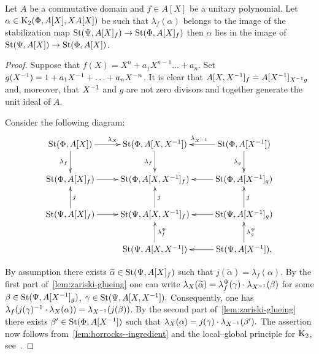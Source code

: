 \begin{lemma} \label{lem:horrocks-b}
 Let $A$ be a commutative domain and $f \in A[X]$ be a unitary polynomial.
 Let $\alpha \in \operatorname{K}_2(\Phi, A[X], XA[X])$ be such that $\lambda_f(\alpha)$ belongs to the image of the stabilization map
 $\operatorname{St}(\Psi, A[X]_f) \to \operatorname{St}(\Phi, A[X]_f)$ then $\alpha$ lies in the image of $\operatorname{St}(\Psi, A[X]) \to \operatorname{St}(\Phi, A[X])$.
\end{lemma}
\begin{proof}
    Suppose that $f(X) = X^n + a_1 X^{n-1} \ldots + a_n$.
    Set $g(X^{-1}) = 1 + a_1 X^{-1} + \ldots + a_{n} X^{-n}$.
    It is clear that $A[X, X^{-1}]_f = A[X^{-1}]_{X^{-1} g}$ and, moreover, that $X^{-1}$ and $g$ are not zero divisors and together generate the unit ideal of $A$.

    Consider the following diagram:
    \[ \xymatrix{\St(\Phi, A[X]) \ar[r]^{\lambda_X} \ar[d]_{\lambda_f} & \St(\Phi, A[X, X\inv]) \ar[d]_{\lambda_f}  & \St(\Phi, A[X\inv]) \ar[l]_{\lambda_{X\inv}} \ar[d]_{\lambda_g}  \\
                 \St(\Phi, A[X]_f) \ar[r] & \St(\Phi, A[X, X\inv]_f) & \St(\Phi, A[X\inv]_g) \ar[l] \\
                 \St(\Psi, A[X]_f) \ar[r] \ar[u]_j & \St(\Psi, A[X, X\inv]_f) \ar[u]_j & \St(\Psi, A[X\inv]_g) \ar[l] \ar[u]_j \\
                                   & \St(\Psi, A[X, X\inv]) \ar[u]_{\lambda_f^\Psi}   & \St(\Psi, A[X\inv]). \ar[l] \ar[u]_{\lambda_g^\Psi}}\]

    By assumption there exists $\widetilde{\alpha} \in \operatorname{St}(\Psi, A[X]_f)$ such that $j(\widetilde{\alpha}) = \lambda_f(\alpha)$.
    By the first part of~\cref{lem:zariski-glueing} one can write $\lambda_X(\widetilde{\alpha}) = \lambda_f^\Psi(\gamma) \cdot \lambda_{X^{-1}}(\beta)$
     for some $\beta \in \operatorname{St}(\Psi, A[X^{-1}]_g)$, $\gamma \in \operatorname{St}(\Psi, A[X, X^{-1}]).$
    Consequently, one has $\lambda_f(j(\gamma)^{-1} \cdot \lambda_X(\alpha)) = \lambda_{X^{-1}}(j(\beta))$.
    By the second part of~\cref{lem:zariski-glueing} there exists $\beta' \in \operatorname{St}(\Phi, A[X^{-1}])$ such that $\lambda_X(\alpha) = j(\gamma) \cdot \lambda_{X^{-1}}(\beta').$
    The assertion now follows from~\cref{lem:horrocks--ingredient} and the local--global principle for $\operatorname{K}_2$, see~\cite{LS17}. %
\end{proof}

